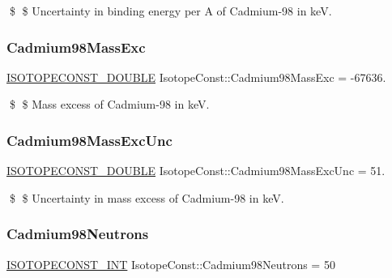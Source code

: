 \$ \$ Uncertainty in binding energy per A of Cadmium-\/98 in keV. \mbox{\label{group___isotope_const-_cadmium-_cd98_ga984bced6e8fb343146ff0e19fc7689ee}} 
\subsubsection{\texorpdfstring{Cadmium98\+Mass\+Exc}{Cadmium98MassExc}}
{\footnotesize\ttfamily \mbox{\hyperlink{group___isotope_const-_macros_ga8f45a7272ce02c0b4c65c44636ed719a}{I\+S\+O\+T\+O\+P\+E\+C\+O\+N\+S\+T\+\_\+\+D\+O\+U\+B\+LE}} Isotope\+Const\+::\+Cadmium98\+Mass\+Exc = -\/67636.}

\$ \$ Mass excess of Cadmium-\/98 in keV. \mbox{\label{group___isotope_const-_cadmium-_cd98_gaaa167225f9256f09ef03e9c630f171b7}} 
\subsubsection{\texorpdfstring{Cadmium98\+Mass\+Exc\+Unc}{Cadmium98MassExcUnc}}
{\footnotesize\ttfamily \mbox{\hyperlink{group___isotope_const-_macros_ga8f45a7272ce02c0b4c65c44636ed719a}{I\+S\+O\+T\+O\+P\+E\+C\+O\+N\+S\+T\+\_\+\+D\+O\+U\+B\+LE}} Isotope\+Const\+::\+Cadmium98\+Mass\+Exc\+Unc = 51.}

\$ \$ Uncertainty in mass excess of Cadmium-\/98 in keV. \mbox{\label{group___isotope_const-_cadmium-_cd98_ga4941a90ad761b0c3345dd18a56d67fe5}} 
\subsubsection{\texorpdfstring{Cadmium98\+Neutrons}{Cadmium98Neutrons}}
{\footnotesize\ttfamily \mbox{\hyperlink{group___isotope_const-_macros_ga5f18360b3e99483a35c32d789e62621c}{I\+S\+O\+T\+O\+P\+E\+C\+O\+N\+S\+T\+\_\+\+I\+NT}} Isotope\+Const\+::\+Cadmium98\+Neutrons = 50}

